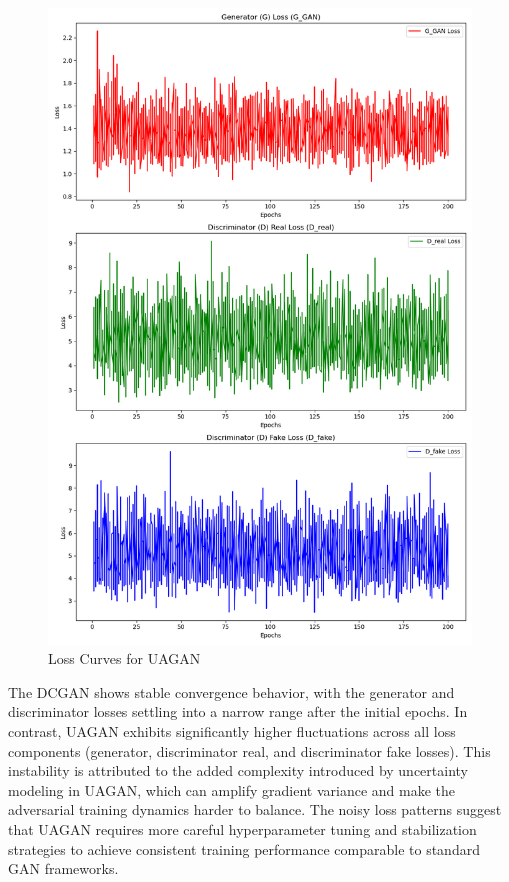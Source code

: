 \documentclass{article}
\begin{document}
\begin{figure}[htbp]
\begin{minipage}{0.45\textwidth}
        \includegraphics[width=\linewidth]{uagan_loss_curves_subplot.png}
        \caption{Loss Curves for UAGAN}
        \label{fig:uagan_loss}
    \end{minipage}
\end{figure}

 The DCGAN shows stable convergence behavior, with the generator and discriminator losses settling into a narrow range after the initial epochs. In contrast, UAGAN exhibits significantly higher fluctuations across all loss components (generator, discriminator real, and discriminator fake losses). This instability is attributed to the added complexity introduced by uncertainty modeling in UAGAN, which can amplify gradient variance and make the adversarial training dynamics harder to balance. The noisy loss patterns suggest that UAGAN requires more careful hyperparameter tuning and stabilization strategies to achieve consistent training performance comparable to standard GAN frameworks.
\end{document}
